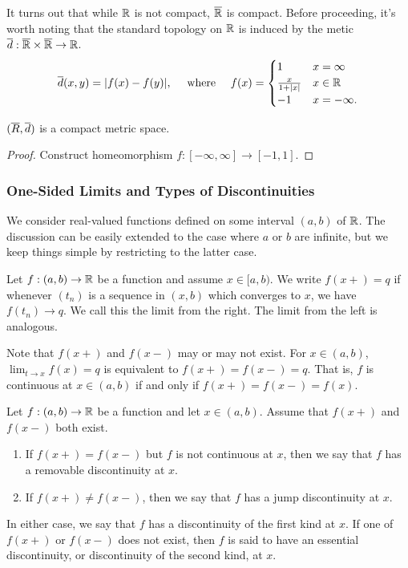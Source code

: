 \documentclass[12pt]{article} %
\begin{document}
It turns out that while $\mathbb{R}$ is not compact, $\overline{\mathbb{R}}$ is compact. Before proceeding, it's worth noting that the standard topology on $\mathbb{R}$ is induced by the metic $\overline{d} : \overline{\mathbb{R}} \times \overline{\mathbb{R}} \to \mathbb{R}$.\[\ol{d}(x, y) = |f(x) - f(y)|, \ \ \ \ \text{where} \ \ \ \ f(x) = \begin{cases}
    1 &x = \infty\\
    \frac{x}{1+|x|} &x \in \R\\
    -1 &x = -\infty.
\end{cases}\]

\begin{proposition}
    $(\overline{R}, \overline{d})$ is a compact metric space.
\end{proposition}

\begin{proof}
    Construct homeomorphism $f : [-\infty, \infty] \to [-1,1]$.
\end{proof}

\subsubsection{One-Sided Limits and Types of Discontinuities}

We consider real-valued functions defined on some interval $(a, b)$ of $\mathbb{R}$. The discussion can be easily extended to the case where $a$ or $b$ are infinite, but we keep things simple by restricting to the latter case.

\begin{definition}
    Let $f : (a, b) \to \mathbb{R}$ be a function and assume $x \in [a, b)$. We write $f(x+) = q$ if whenever $(t_n)$ is a sequence in $(x, b)$ which converges to $x$, we have $f(t_n) \to q$. We call this the limit from the right. The limit from the left is analogous.
\end{definition}

\begin{remark}
    Note that $f(x+)$ and $f(x-)$ may or may not exist. For $x \in (a, b)$, $\lim_{t \to x} f(x) = q$ is equivalent to $f(x+) = f(x-) = q$. That is, $f$ is continuous at $x \in (a,b)$ if and only if ${f(x+) = f(x-) = f(x)}$.
\end{remark}

\begin{definition}
    Let $f : (a, b) \to \mathbb{R}$ be a function and let $x \in (a,b)$. Assume that $f(x+)$ and $f(x-)$ both exist. \begin{enumerate}
        \item If $f(x+) = f(x-)$ but $f$ is not continuous at $x$, then we say that $f$ has a removable discontinuity at $x$.
        \item If $f(x+) \neq f(x-)$, then we say that $f$ has a jump discontinuity at $x$. 
    \end{enumerate} In either case, we say that $f$ has a discontinuity of the first kind at $x$. If one of $f(x+)$ or $f(x-)$ does not exist, then $f$ is said to have an essential discontinuity, or discontinuity of the second kind, at $x$.
\end{definition}
\end{document}
